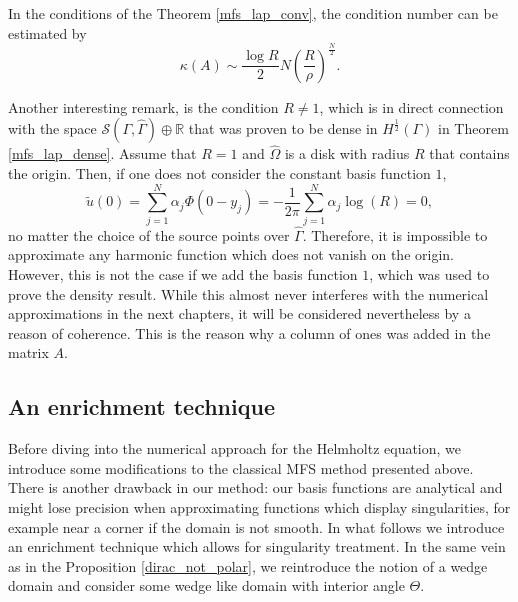 \begin{theorem}
    In the conditions of the Theorem \eqref{mfs_lap_conv}, the condition number can be estimated by
    \[
        \kappa(A) \sim \frac{\log R}{2}N \left(\frac{R}{\rho}\right)^{\frac{N}{2}}.
    \]
\end{theorem}
Another interesting remark, is the condition \(R \neq 1\), which is in direct connection with the space \(\mathcal{S}(\Gamma, \hat{\Gamma}) \oplus \mathbb{R}\) that was proven to be dense in \(H^\frac{1}{2}(\Gamma)\) in Theorem \eqref{mfs_lap_dense}. Assume that \(R=1\) and \(\hat{\Omega}\) is a disk with radius \(R\) that contains the origin. Then, if one does not consider the constant basis function \(1\),
\[
    \tilde{u}(0) = \sum_{j=1}^{N}\alpha_j \Phi(0-y_j) = -\frac{1}{2\pi}\sum_{j=1}^{N}\alpha_j \log(R) = 0,
\]
no matter the choice of the source points over \(\hat{\Gamma}\). Therefore, it is impossible to approximate any harmonic function which does not vanish on the origin. However, this is not the case if we add the basis function \(1\), which was used to prove the density result. While this almost never interferes with the numerical approximations in the next chapters, it will be considered nevertheless by a reason of coherence. This is the reason why a column of ones was added in the matrix \(A\).

\subsection{An enrichment technique}\label{m_particular_solutions}

Before diving into the numerical approach for the Helmholtz equation, we introduce some modifications to the classical MFS method presented above. There is another drawback in our method: our basis functions are analytical and might lose precision when approximating functions which display singularities, for example near a corner if the domain is not smooth. In what follows we introduce an enrichment technique which allows for singularity treatment. In the same vein as in the Proposition \eqref{dirac_not_polar}, we reintroduce the notion of a wedge domain and consider some wedge like domain with interior angle \(\Theta\).
    
